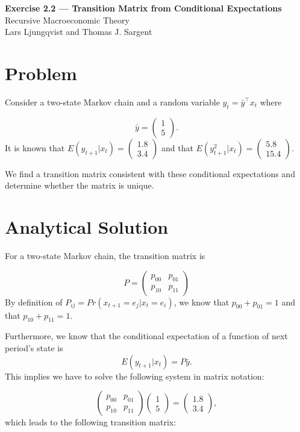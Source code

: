 \documentclass[11pt]{article}
\begin{document}
\begin{center}
    {\LARGE \textbf{Exercise 2.2 — Transition Matrix from Conditional Expectations}}\\[0.5em]
    {\large Recursive Macroeconomic Theory}\\[0.25em]
    {\normalsize Lars Ljungqvist and Thomas J. Sargent}
\end{center}

\vspace{1em}

\section*{Problem}

Consider a two-state Markov chain and a random variable \(y_t=\bar{y}^{\top}x_t\) where

\[
\bar y =
\begin{pmatrix}
1 \\
5
\end{pmatrix}.
\]
It is known that \(E(y_{t+1}|x_t) = \begin{pmatrix}
    1.8 \\
    3.4
\end{pmatrix}\) and that \(E(y_{t+1}^2|x_t) = \begin{pmatrix}
    5.8\\
    15.4
\end{pmatrix}.\)

We find a transition matrix consistent with these conditional expectations and determine whether the matrix is unique.


\section*{Analytical Solution}

For a two-state Markov chain, the transition matrix is 

\[
P = \begin{pmatrix}
    p_{00} & p_{01} \\
    p_{10} & p_{11}
\end{pmatrix}
\]
By definition of \(P_{ij}= Pr(x_{t+1}=e_j | x_t = e_i)\), we know that \(p_{00} +p_{01}=1\) and that \(p_{10} + p_{11}= 1\).

Furthermore, we know that the conditional expectation of a function of next period's state is 
\[
E(y_{t+1}|x_t)= P\bar{y}.
\]
This implies we have to solve the following system in matrix notation:

\[
\begin{pmatrix}
    p_{00} & p_{01} \\
    p_{10} & p_{11}
\end{pmatrix}
\begin{pmatrix}
    1 \\
    5
\end{pmatrix}=\begin{pmatrix}
    1.8 \\
    3.4
\end{pmatrix},
\]
which leads to the following transition matrix:
\end{document}

